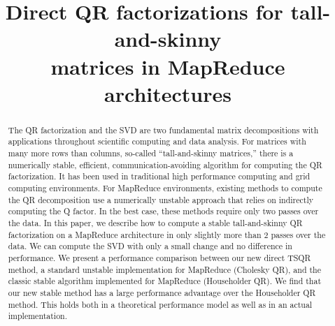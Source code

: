 \documentclass[10pt, conference, compsocconf]{IEEEtran}
\begin{document}
\title{Direct QR factorizations for tall-and-skinny \\
matrices in MapReduce architectures}



\author{
\and
{}
\and
{}
}

\maketitle

\begin{abstract}
The QR factorization and the SVD are two fundamental matrix decompositions with applications throughout scientific computing and data analysis.  For matrices with many more rows than columns, so-called ``tall-and-skinny matrices,'' there is a numerically stable, efficient, communication-avoiding algorithm for computing the QR factorization.  It has been used in traditional high performance computing and grid computing environments.  For MapReduce environments, existing methods to compute the QR decomposition use a numerically unstable approach that relies on indirectly computing the Q factor.  In the best case, these methods require only two passes over the data. 
In this paper, we describe how to compute a stable tall-and-skinny QR factorization on a MapReduce architecture in only slightly more than 2 passes over the data.  We can compute the SVD with only a small change and no difference in performance.  We present a performance comparison between our new direct TSQR method, a standard unstable implementation for MapReduce (Cholesky QR), and the classic stable algorithm implemented for MapReduce (Householder QR).  We find that our new stable method has a large performance advantage over the Householder QR method.  This holds both in a theoretical performance model as well as in an actual implementation.
\end{abstract}
\end{document}
